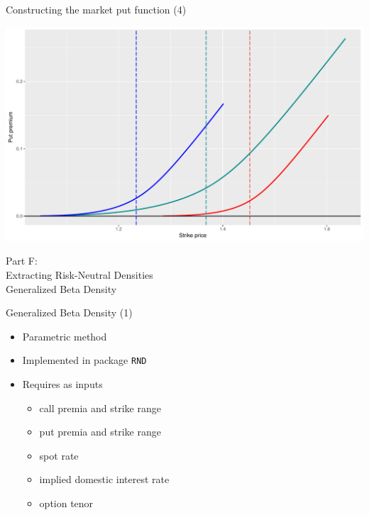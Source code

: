 \documentclass[ignorenonframetext,aspectratio=169]{beamer}
\providecommand{\tightlist}{%
  \setlength{\itemsep}{0pt}\setlength{\parskip}{0pt}}
\begin{document}
\begin{frame}{Constructing the market put function (4)}

\includegraphics[width=0.9\linewidth]{2018_02_07_IMF_FXCourse_files/figure-beamer/unnamed-chunk-48-1}

\end{frame}

\begin{frame}{}

\color{blue} \LARGE{Part F:}\\
\LARGE{Extracting Risk-Neutral Densities}\\
\Large{Generalized Beta Density}

\end{frame}

\begin{frame}[fragile]{Generalized Beta Density (1)}

\begin{itemize}
\tightlist
\item
  Parametric method
\item
  Implemented in package \texttt{RND}
\item
  Requires as inputs

  \begin{itemize}
  \tightlist
  \item
    call premia and strike range
  \item
    put premia and strike range
  \item
    spot rate
  \item
    implied domestic interest rate
  \item
    option tenor
  \end{itemize}
\end{itemize}

\end{frame}
\end{document}
